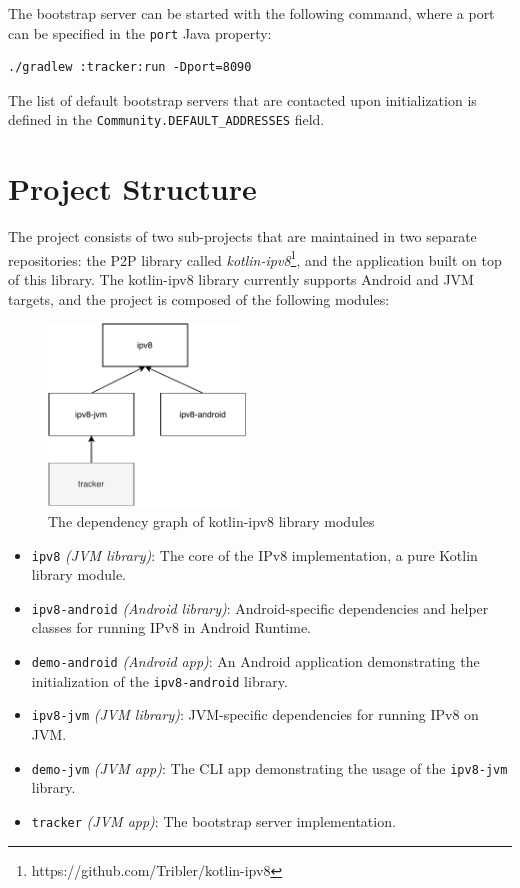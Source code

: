 The bootstrap server can be started with the following command, where a port can be specified in the \texttt{port} Java property:

\begin{verbatim}
./gradlew :tracker:run -Dport=8090
\end{verbatim}

The list of default bootstrap servers that are contacted upon initialization is defined in the \texttt{Community.DEFAULT\_ADDRESSES} field.

\section{Project Structure}

The project consists of two sub-projects that are maintained in two separate repositories: the P2P library called \textit{kotlin-ipv8}\footnote{https://github.com/Tribler/kotlin-ipv8}, and the application built on top of this library. The kotlin-ipv8 library currently supports Android and JVM targets, and the project is composed of the following modules:

\begin{figure}
    \centering
    \includegraphics[width=0.47\textwidth]{diagrams/ipv8-modules}
    \caption{The dependency graph of kotlin-ipv8 library modules}
    \label{ipv8-graph}
\end{figure}


\begin{itemize}
    \item \texttt{ipv8} \textit{(JVM library)}: The core of the IPv8 implementation, a pure Kotlin library module.
    \item \texttt{ipv8-android} \textit{(Android library)}: Android-specific dependencies and helper classes for running IPv8 in Android Runtime.
    \item \texttt{demo-android} \textit{(Android app)}: An Android application demonstrating the initialization of the \texttt{ipv8-android} library.
    \item \texttt{ipv8-jvm} \textit{(JVM library)}: JVM-specific dependencies for running IPv8 on JVM.
    \item \texttt{demo-jvm} \textit{(JVM app)}: The CLI app demonstrating the usage of the \texttt{ipv8-jvm} library.
    \item \texttt{tracker} \textit{(JVM app)}: The bootstrap server implementation.
\end{itemize}

